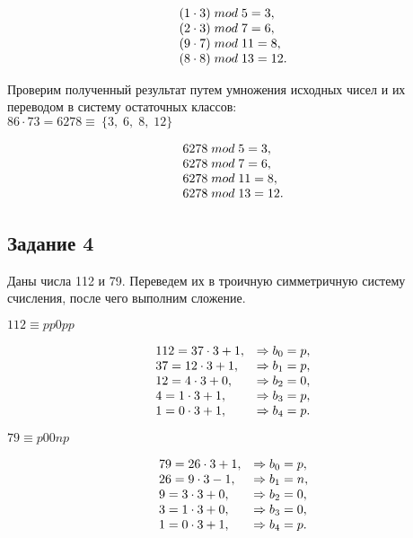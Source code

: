 \documentclass[a4paper,14pt]{extarticle}
\begin{document}
  \[
  \begin{array}[c]{l}
    (1\cdot3)\;mod\;5 = 3,\\
    (2\cdot3)\;mod\;7 = 6,\\
    (9\cdot7)\;mod\;11 = 8,\\
    (8\cdot8)\;mod\;13 = 12.
  \end{array}
  \]

  Проверим полученный результат путем умножения исходных чисел и их переводом в систему остаточных классов:\\
  $86\cdot73=6278 \equiv\ \{3,\;6,\;8,\;12\}$

  \[
  \begin{array}[c]{l}
    6278\;mod\;5 = 3,\\
    6278\;mod\;7 = 6,\\
    6278\;mod\;11 = 8,\\
    6278\;mod\;13 = 12.\\
  \end{array}
  \]

  \subsection*{Задание 4}

  Даны числа 112 и 79. Переведем их в троичную симметричную систему счисления, после чего выполним сложение.

  $112 \equiv pp0pp$

  \[
  \begin{array}[c]{ll}
    112 = 37 \cdot 3 + 1, &\Rightarrow b_{0} = p,\\
    37 = 12 \cdot 3 + 1, &\Rightarrow b_{1} = p,\\
    12 = 4 \cdot 3 + 0, &\Rightarrow b_{2} = 0,\\
    4 = 1 \cdot 3 + 1, &\Rightarrow b_{3} = p,\\
    1 = 0 \cdot 3 + 1, &\Rightarrow b_{4} = p.
  \end{array}
  \]

  \pagebreak

  $79 \equiv p00np$

  \[
  \begin{array}[c]{ll}
    79 = 26 \cdot 3 + 1, &\Rightarrow b_{0} = p,\\
    26 = 9 \cdot 3 - 1, &\Rightarrow b_{1} = n,\\
    9 = 3 \cdot 3 + 0, &\Rightarrow b_{2} = 0,\\
    3 = 1 \cdot 3 + 0, &\Rightarrow b_{3} = 0,\\
    1 = 0 \cdot 3 + 1, &\Rightarrow b_{4} = p.
  \end{array}
  \]
\end{document}
